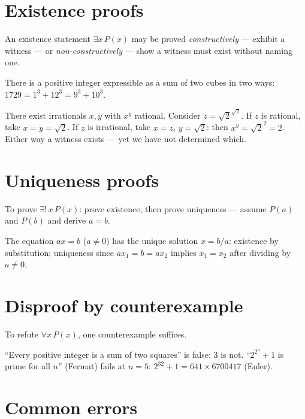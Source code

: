\section{Existence proofs}

An existence statement $\exists x\,P(x)$ may be proved
\emph{constructively} --- exhibit a witness --- or
\emph{non-constructively} --- show a witness must exist without naming one.

\begin{example}[Constructive]
There is a positive integer expressible as a sum of two cubes in two ways:
$1729 = 1^3 + 12^3 = 9^3 + 10^3$.
\end{example}

\begin{example}\label{ex:noncon}
There exist irrationals $x, y$ with $x^{y}$ rational. Consider
$z = \sqrt2^{\sqrt2}$. If $z$ is rational, take $x = y = \sqrt2$. If $z$ is
irrational, take $x = z$, $y = \sqrt2$: then
$x^{y} = \sqrt2^{2} = 2$. Either way a witness exists --- yet we have not
determined which.
\end{example}

\section{Uniqueness proofs}

To prove $\exists!\,x\,P(x)$: prove existence, then prove uniqueness ---
assume $P(a)$ and $P(b)$ and derive $a = b$.

\begin{example}
The equation $ax = b$ ($a \neq 0$) has the unique solution $x = b/a$:
existence by substitution; uniqueness since $ax_1 = b = ax_2$ implies
$x_1 = x_2$ after dividing by $a \neq 0$.
\end{example}

\section{Disproof by counterexample}

To refute $\forall x\,P(x)$, one counterexample suffices.

\begin{example}
``Every positive integer is a sum of two squares'' is false: $3$ is not.
``$2^{2^n} + 1$ is prime for all $n$'' (Fermat) fails at $n = 5$:
$2^{32} + 1 = 641 \times 6700417$ (Euler).
\end{example}

\section{Common errors}

